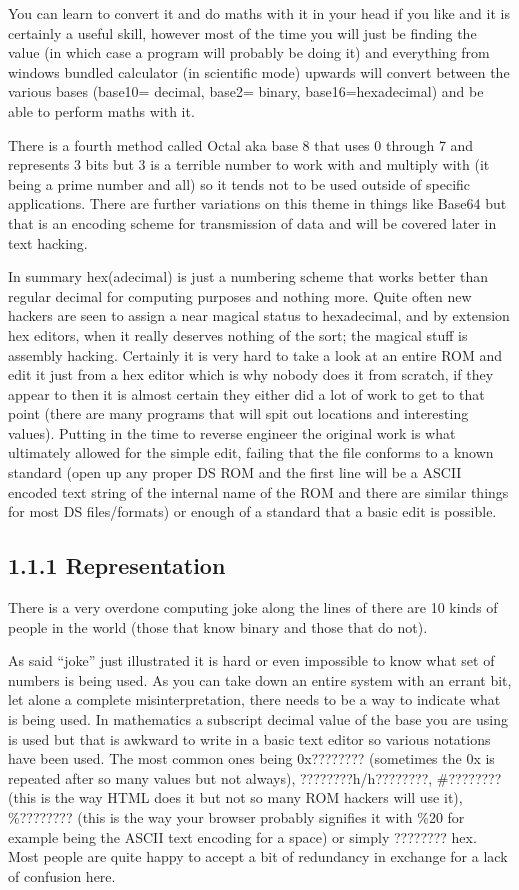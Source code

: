 \documentclass[
]{book}
\begin{document}
You can learn to convert it and do maths with it in your head if you like and it is certainly a useful skill, however most of the time you will just be finding the value (in which case a program will probably be doing it) and everything from windows bundled calculator (in scientific mode) upwards will convert between the various bases (base10= decimal, base2= binary, base16=hexadecimal) and be able to perform maths with it.

There is a fourth method called Octal aka base 8 that uses 0 through 7 and represents 3 bits but 3 is a terrible number to work with and multiply with (it being a prime number and all) so it tends not to be used outside of specific applications. There are further variations on this theme in things like Base64 but that is an encoding scheme for transmission of data and will be covered later in text hacking.

In summary hex(adecimal) is just a numbering scheme that works better than regular decimal for computing purposes and nothing more. Quite often new hackers are seen to assign a near magical status to hexadecimal, and by extension hex editors, when it really deserves nothing of the sort; the magical stuff is assembly hacking. Certainly it is very hard to take a look at an entire ROM and edit it just from a hex editor which is why nobody does it from scratch, if they appear to then it is almost certain they either did a lot of work to get to that point (there are many programs that will spit out locations and interesting values). Putting in the time to reverse engineer the original work is what ultimately allowed for the simple edit, failing that the file conforms to a known standard (open up any proper DS ROM and the first line will be a ASCII encoded text string of the internal name of the ROM and there are similar things for most DS files/formats) or enough of a standard that a basic edit is possible.

\hypertarget{representation}{%
\subsection{1.1.1 Representation}\label{representation}}

There is a very overdone computing joke along the lines of there are 10 kinds of people in the world (those that know binary and those that do not).

As said ``joke'' just illustrated it is hard or even impossible to know what set of numbers is being used. As you can take down an entire system with an errant bit, let alone a complete misinterpretation, there needs to be a way to indicate what is being used. In mathematics a subscript decimal value of the base you are using is used but that is awkward to write in a basic text editor so various notations have been used. The most common ones being 0x???????? (sometimes the 0x is repeated after so many values but not always), ????????h/h????????, \#???????? (this is the way HTML does it but not so many ROM hackers will use it), \%???????? (this is the way your browser probably signifies it with \%20 for example being the ASCII text encoding for a space) or simply ???????? hex. Most people are quite happy to accept a bit of redundancy in exchange for a lack of confusion here.
\end{document}
